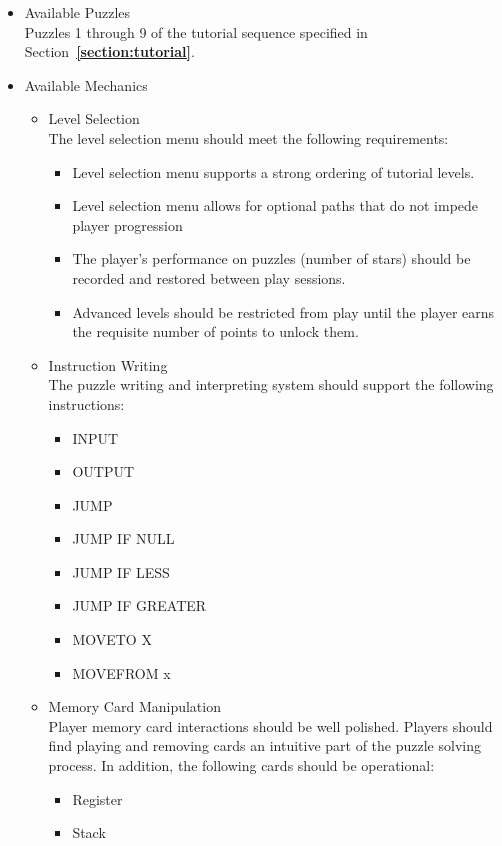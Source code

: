 \begin{itemize}
	\item Available Puzzles\\
	Puzzles 1 through 9 of the tutorial sequence specified in Section~\textbf{\ref{section:tutorial}}.
	\item Available Mechanics
	\begin{itemize}
		\item Level Selection\\
		The level selection menu should meet the following requirements:
		\begin{itemize}
			\item Level selection menu supports a strong ordering of tutorial levels.
			\item Level selection menu allows for optional paths that do not impede player 
			progression
			\item The player's performance on puzzles (number of stars) should be recorded 
			and restored between play sessions.
			\item Advanced levels should be restricted from play until the player earns the 
			requisite number of points to unlock them.
		\end{itemize}
		\item Instruction Writing\\
		The puzzle writing and interpreting system should support the following instructions:
		\begin{itemize}
			\item INPUT
			\item OUTPUT
			\item JUMP
			\item JUMP IF NULL
			\item JUMP IF LESS
			\item JUMP IF GREATER
			\item MOVETO X
			\item MOVEFROM x
		\end{itemize}
		\item Memory Card Manipulation\\
		Player memory card interactions should be well polished. Players should find 
		playing and removing cards an intuitive part of the puzzle solving process. In 
		addition, the following cards should be operational:
		\begin{itemize}
			\item Register
			\item Stack
		\end{itemize}
	\end{itemize}
\end{itemize}


